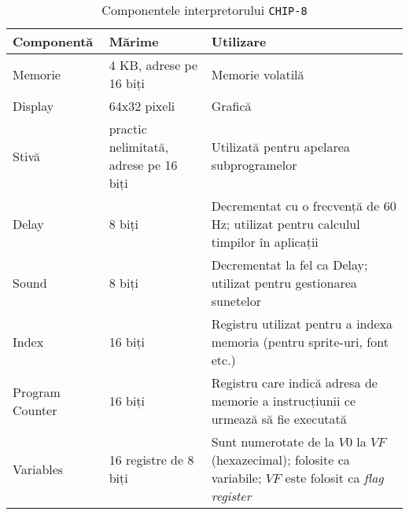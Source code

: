 \documentclass[a4paper]{article}
\begin{document}
\begin{table}
	\begin{center}
		\begin{tabular}{ |p{5em}|p{8em}|p{16em}| }
			\hline
			\textbf{Componentă} & \textbf{Mărime}                       & \textbf{Utilizare}                                                                                                   \\
			\hline\hline
			Memorie             & 4 KB, adrese pe 16 biți               & Memorie volatilă                                                                                                     \\
			\hline
			Display             & 64x32 pixeli                          & Grafică                                                                                                              \\
			\hline
			Stivă               & practic nelimitată, adrese pe 16 biți & Utilizată pentru apelarea subprogramelor                                                                             \\
			\hline
			Delay               & 8 biți                                & Decrementat cu o frecvență de 60 Hz; utilizat pentru calculul timpilor în aplicații                                  \\
			\hline
			Sound               & 8 biți                                & Decrementat la fel ca Delay; utilizat pentru gestionarea sunetelor                                                   \\
			\hline
			Index               & 16 biți                               & Registru utilizat pentru a indexa memoria (pentru sprite-uri, font etc.)                                             \\
			\hline
			Program Counter     & 16 biți                               & Registru care indică adresa de memorie a instrucțiunii ce urmează să fie executată                                   \\
			\hline
			Variables           & 16 registre de 8 biți                 & Sunt numerotate de la $V0$ la $VF$ (hexazecimal); folosite ca variabile; $VF$ este folosit ca \textit{flag register} \\
			\hline
		\end{tabular}
		\caption{Componentele interpretorului \texttt{CHIP-8}\cite{langhoff}}
		\label{tab:componente}
	\end{center}
\end{table}
\end{document}
